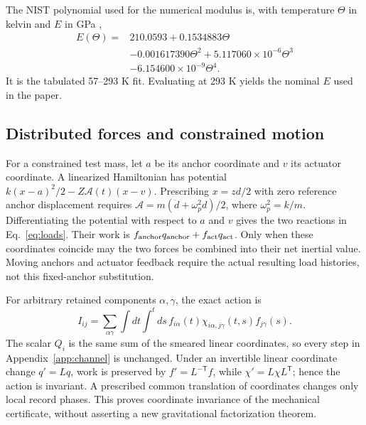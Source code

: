 The NIST polynomial used for the numerical modulus is, with temperature $\Theta$ in kelvin and $E$ in GPa \cite{NISTsteel},
\begin{equation}
\begin{split}
E(\Theta)={}&210.0593+0.1534883\Theta\\
&-0.001617390\Theta^2+5.117060\times10^{-6}\Theta^3\\
&-6.154600\times10^{-9}\Theta^4.
\end{split}
\label{eq:modulus}
\end{equation}
It is the tabulated 57--293 K fit. Evaluating at 293 K yields the nominal $E$ used in the paper.

\subsection{Distributed forces and constrained motion}
For a constrained test mass, let $a$ be its anchor coordinate and $v$ its actuator coordinate. A linearized Hamiltonian has potential $k(x-a)^2/2-Z\mathcal A(t)(x-v)$. Prescribing $x=zd/2$ with zero reference anchor displacement requires $\mathcal A=m(\ddot d+\omega_p^2d)/2$, where $\omega_p^2=k/m$. Differentiating the potential with respect to $a$ and $v$ gives the two reactions in Eq.~\eqref{eq:loads}. Their work is $f_{\rm anchor}q_{\rm anchor}+f_{\rm act}q_{\rm act}$. Only when these coordinates coincide may the two forces be combined into their net inertial value. Moving anchors and actuator feedback require the actual resulting load histories, not this fixed-anchor substitution.

For arbitrary retained components $\alpha,\gamma$, the exact action is
\begin{equation}
I_{ij}=\sum_{\alpha\gamma}\int dt\int^t ds\,
f_{i\alpha}(t)\chi_{i\alpha,j\gamma}(t,s)f_{j\gamma}(s).
\label{eq:vectoraction}
\end{equation}
The scalar $Q_i$ is the same sum of the smeared linear coordinates, so every step in Appendix~\ref{app:channel} is unchanged. Under an invertible linear coordinate change $q'=Lq$, work is preserved by $f'=L^{-\mathsf T}f$, while $\chi'=L\chi L^{\mathsf T}$; hence the action is invariant. A prescribed common translation of coordinates changes only local record phases. This proves coordinate invariance of the mechanical certificate, without asserting a new gravitational factorization theorem.

